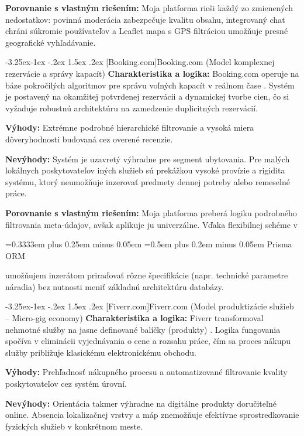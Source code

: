\documentclass[12pt]{article}
\makeatletter
\newcommand{\hlcode}[1]{%
  \allowbreak
  \begingroup
  \setlength{\fboxsep}{2.4pt}%
  \setlength{\fboxrule}{0pt}%
  \colorbox{gray!15}{%
    \strut
    {\ttfamily\small
     \hyphenpenalty=10000
     \exhyphenpenalty=10000
     \spaceskip=0.3333em plus 0.25em minus 0.05em
     \xspaceskip=0.5em plus 0.2em minus 0.05em
     #1}%
  }%
  \endgroup
  \allowbreak
}
\renewcommand{\subsubsection}{\@startsection{subsubsection}{3}{\z@}%
  {-3.25ex\@plus -1ex \@minus -.2ex}%
  {1.5ex \@plus .2ex}%
  {\normalfont\large\bfseries}}
\makeatother
\begin{document}
\textbf{Porovnanie s vlastným riešením:} Moja platforma rieši každý zo zmienených nedostatkov: povinná moderácia zabezpečuje kvalitu obsahu, integrovaný chat chráni súkromie používateľov a Leaflet mapa s GPS filtráciou umožňuje presné geografické vyhľadávanie.

\subsubsection[Booking.com]{Booking.com (Model komplexnej rezervácie a správy kapacít)}
\textbf{Charakteristika a logika:} Booking.com operuje na báze pokročilých algoritmov pre správu voľných kapacít v reálnom čase \parencite{rochet2003platform}. Systém je postavený na okamžitej potvrdenej rezervácii a dynamickej tvorbe cien, čo si vyžaduje robustnú architektúru na zamedzenie duplicitných rezervácií.

\textbf{Výhody:} Extrémne podrobné hierarchické filtrovanie a vysoká miera dôveryhodnosti budovaná cez overené recenzie.

\textbf{Nevýhody:} Systém je uzavretý výhradne pre segment ubytovania. Pre malých lokálnych poskytovateľov iných služieb sú prekážkou vysoké provízie a rigidita systému, ktorý neumožňuje inzerovať predmety dennej potreby alebo remeselné práce.

\textbf{Porovnanie s vlastným riešením:} Moja platforma preberá logiku podrobného filtrovania meta-údajov, avšak aplikuje ju univerzálne. Vďaka flexibilnej schéme v \hlcode{Prisma ORM} umožňujem inzerátom priraďovať rôzne špecifikácie (napr. technické parametre náradia) bez nutnosti meniť základnú architektúru databázy.

\subsubsection[Fiverr.com]{Fiverr.com (Model produktizácie služieb -- Micro-gig economy)}
\textbf{Charakteristika a logika:} Fiverr transformoval nehmotné služby na jasne definované balíčky (produkty) \parencite{vallas2020platforms}. Logika fungovania spočíva v eliminácii vyjednávania o cene a rozsahu práce, čím sa proces nákupu služby približuje klasickému elektronickému obchodu.

\textbf{Výhody:} Prehľadnosť nákupného procesu a automatizované filtrovanie kvality poskytovateľov cez systém úrovní.

\textbf{Nevýhody:} Orientácia takmer výhradne na digitálne produkty doručiteľné online. Absencia lokalizačnej vrstvy a máp znemožňuje efektívne sprostredkovanie fyzických služieb v konkrétnom meste.
\end{document}
